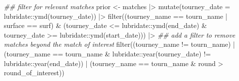 \documentclass[
  letterpaper,
  DIV=11,
  numbers=noendperiod]{scrartcl}
\newenvironment{Shaded}{\begin{snugshade}}{\end{snugshade}}
\newcommand{\AttributeTok}[1]{\textcolor[rgb]{0.40,0.45,0.13}{#1}}
\newcommand{\DocumentationTok}[1]{\textcolor[rgb]{0.37,0.37,0.37}{\textit{#1}}}
\newcommand{\FunctionTok}[1]{\textcolor[rgb]{0.28,0.35,0.67}{#1}}
\newcommand{\NormalTok}[1]{\textcolor[rgb]{0.00,0.23,0.31}{#1}}
\newcommand{\OtherTok}[1]{\textcolor[rgb]{0.00,0.23,0.31}{#1}}
\newcommand{\SpecialCharTok}[1]{\textcolor[rgb]{0.37,0.37,0.37}{#1}}
\begin{document}
\begin{Shaded}
\begin{Highlighting}[]
  \DocumentationTok{\#\# filter for relevant matches}
\NormalTok{  prior }\OtherTok{\textless{}{-}}\NormalTok{ matches }\SpecialCharTok{|\textgreater{}}
    \FunctionTok{mutate}\NormalTok{(}\AttributeTok{tourney\_date =}\NormalTok{ lubridate}\SpecialCharTok{::}\FunctionTok{ymd}\NormalTok{(tourney\_date)) }\SpecialCharTok{|\textgreater{}}
    \FunctionTok{filter}\NormalTok{((tourney\_name }\SpecialCharTok{==}\NormalTok{ tourn\_name }\SpecialCharTok{|}\NormalTok{ surface }\SpecialCharTok{==}\NormalTok{ surf) }\SpecialCharTok{\&}
\NormalTok{             (tourney\_date }\SpecialCharTok{\textless{}=}\NormalTok{ lubridate}\SpecialCharTok{::}\FunctionTok{ymd}\NormalTok{(end\_date) }\SpecialCharTok{\&} 
\NormalTok{                tourney\_date }\SpecialCharTok{\textgreater{}=}\NormalTok{ lubridate}\SpecialCharTok{::}\FunctionTok{ymd}\NormalTok{(start\_date))) }\SpecialCharTok{|\textgreater{}}
    \DocumentationTok{\#\# add a filter to remove matches beyond the match of interest}
    \FunctionTok{filter}\NormalTok{((tourney\_name }\SpecialCharTok{!=}\NormalTok{ tourn\_name) }\SpecialCharTok{|}
\NormalTok{             (tourney\_name }\SpecialCharTok{==}\NormalTok{ tourn\_name }\SpecialCharTok{\&} 
\NormalTok{                lubridate}\SpecialCharTok{::}\FunctionTok{year}\NormalTok{(tourney\_date) }\SpecialCharTok{!=}\NormalTok{ lubridate}\SpecialCharTok{::}\FunctionTok{year}\NormalTok{(end\_date)) }\SpecialCharTok{|}
\NormalTok{             (tourney\_name }\SpecialCharTok{==}\NormalTok{ tourn\_name }\SpecialCharTok{\&}\NormalTok{ round }\SpecialCharTok{\textgreater{}}\NormalTok{ round\_of\_interest))}
  

\end{Highlighting}
\end{Shaded}
\end{document}
